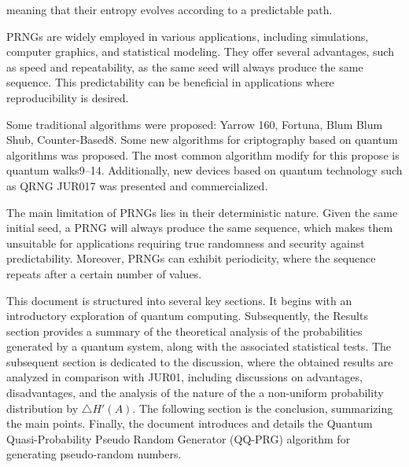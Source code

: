 \documentclass[12pt]{article}
\begin{document}
{	meaning that their entropy evolves according to a predictable path.\par
	PRNGs are widely employed in various applications, including simulations, computer graphics, and statistical modeling.
	They offer several advantages, such as speed and repeatability, as the same seed will always produce the same sequence. This
	predictability can be beneficial in applications where reproducibility is desired.\par
	Some traditional algorithms were proposed: Yarrow 160, Fortuna, Blum Blum Shub, Counter-Based8. Some new algorithms
	for criptography based on quantum algorithms was proposed. The most common algorithm modify for this propose is quantum
	walks9–14. Additionally, new devices based on quantum technology such as QRNG JUR017 was presented and commercialized.\par
	The main limitation of PRNGs lies in their deterministic nature. Given the same initial seed, a PRNG will always produce
	the same sequence, which makes them unsuitable for applications requiring true randomness and security against predictability.
	Moreover, PRNGs can exhibit periodicity, where the sequence repeats after a certain number of values.\par
	This document is structured into several key sections. It begins with an introductory exploration of quantum computing.
	Subsequently, the Results section provides a summary of the theoretical analysis of the probabilities generated by a quantum
	system, along with the associated statistical tests. The subsequent section is dedicated to the discussion, where the obtained
	results are analyzed in comparison with JUR01, including discussions on advantages, disadvantages, and the analysis of the
	nature of the a non-uniform probability distribution by $\triangle H '(A)$. The following section is the conclusion, summarizing the main
	points. Finally, the document introduces and details the Quantum Quasi-Probability Pseudo Random Generator (QQ-PRG) algorithm for generating pseudo-random numbers.}\\
	
\end{document}
